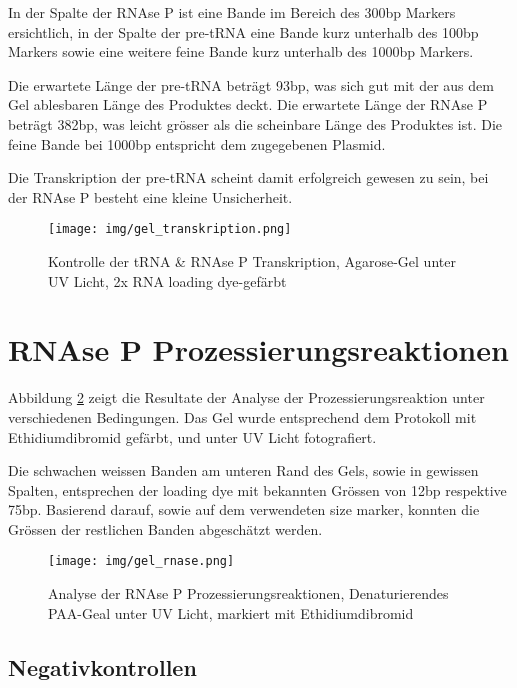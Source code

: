 \documentclass[a4paper,english]{scrreprt}
\begin{document}
In der Spalte der RNAse P ist eine Bande im Bereich des 300bp Markers
ersichtlich, in der Spalte der pre-tRNA eine Bande kurz unterhalb des 100bp
Markers sowie eine weitere feine Bande kurz unterhalb des 1000bp Markers.

Die erwartete Länge der pre-tRNA beträgt 93bp, was sich gut mit der aus dem Gel
ablesbaren Länge des Produktes deckt. Die erwartete Länge der RNAse P beträgt
382bp, was leicht grösser als die scheinbare Länge des Produktes ist. Die feine
Bande bei 1000bp entspricht dem zugegebenen Plasmid.

Die Transkription der pre-tRNA scheint damit erfolgreich gewesen zu sein, bei
der RNAse P besteht eine kleine Unsicherheit.

\begin{figure}[h]
	\centering
	\texttt{[image: img/gel\_transkription.png]}
	\caption{Kontrolle der tRNA \& RNAse P Transkription, Agarose-Gel unter UV Licht, 2x RNA loading dye-gefärbt}
	\label{fig:transkription_kontrolle}
\end{figure}

\section{RNAse P Prozessierungsreaktionen}

Abbildung \ref{fig:rnase_prozessierungsreaktionen} zeigt die Resultate der
Analyse der Prozessierungsreaktion unter verschiedenen Bedingungen. Das Gel
wurde entsprechend dem Protokoll mit Ethidiumdibromid gefärbt, und unter UV
Licht fotografiert.

Die schwachen weissen Banden am unteren Rand des Gels, sowie in gewissen
Spalten, entsprechen der loading dye mit bekannten Grössen von 12bp respektive
75bp. Basierend darauf, sowie auf dem verwendeten size marker, konnten die
Grössen der restlichen Banden abgeschätzt werden.

\begin{figure}[h]
	\centering
	\texttt{[image: img/gel\_rnase.png]}
	\caption{Analyse der RNAse P Prozessierungsreaktionen, Denaturierendes PAA-Geal unter UV Licht, markiert mit Ethidiumdibromid}
	\label{fig:rnase_prozessierungsreaktionen}
\end{figure}


\subsection{Negativkontrollen}
\end{document}
